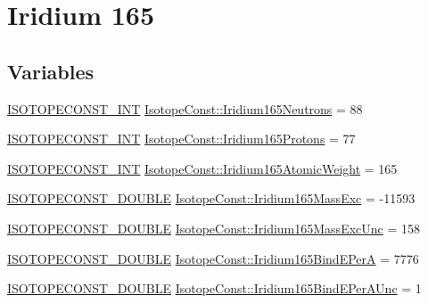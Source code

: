 \hypertarget{group___isotope_const-_iridium-_ir165}{}\section{Iridium 165}
\label{group___isotope_const-_iridium-_ir165}
\subsection*{Variables}
\begin{DoxyCompactItemize}
\item 
\mbox{\hyperlink{group___isotope_const-_macros_ga5f18360b3e99483a35c32d789e62621c}{I\+S\+O\+T\+O\+P\+E\+C\+O\+N\+S\+T\+\_\+\+I\+NT}} \mbox{\hyperlink{group___isotope_const-_iridium-_ir165_ga94b996e9bcab90deb0371a7df3cb9627}{Isotope\+Const\+::\+Iridium165\+Neutrons}} = 88
\item 
\mbox{\hyperlink{group___isotope_const-_macros_ga5f18360b3e99483a35c32d789e62621c}{I\+S\+O\+T\+O\+P\+E\+C\+O\+N\+S\+T\+\_\+\+I\+NT}} \mbox{\hyperlink{group___isotope_const-_iridium-_ir165_ga94d63f1c8b68cb888809b7d00ce1d406}{Isotope\+Const\+::\+Iridium165\+Protons}} = 77
\item 
\mbox{\hyperlink{group___isotope_const-_macros_ga5f18360b3e99483a35c32d789e62621c}{I\+S\+O\+T\+O\+P\+E\+C\+O\+N\+S\+T\+\_\+\+I\+NT}} \mbox{\hyperlink{group___isotope_const-_iridium-_ir165_gaa71f82a78adfeedee28b6da8de1dd3be}{Isotope\+Const\+::\+Iridium165\+Atomic\+Weight}} = 165
\item 
\mbox{\hyperlink{group___isotope_const-_macros_ga8f45a7272ce02c0b4c65c44636ed719a}{I\+S\+O\+T\+O\+P\+E\+C\+O\+N\+S\+T\+\_\+\+D\+O\+U\+B\+LE}} \mbox{\hyperlink{group___isotope_const-_iridium-_ir165_ga7c6456fe2a26f65103d356eb70e8ff64}{Isotope\+Const\+::\+Iridium165\+Mass\+Exc}} = -\/11593
\item 
\mbox{\hyperlink{group___isotope_const-_macros_ga8f45a7272ce02c0b4c65c44636ed719a}{I\+S\+O\+T\+O\+P\+E\+C\+O\+N\+S\+T\+\_\+\+D\+O\+U\+B\+LE}} \mbox{\hyperlink{group___isotope_const-_iridium-_ir165_ga08a353faafb18847ef16615e505c45d7}{Isotope\+Const\+::\+Iridium165\+Mass\+Exc\+Unc}} = 158
\item 
\mbox{\hyperlink{group___isotope_const-_macros_ga8f45a7272ce02c0b4c65c44636ed719a}{I\+S\+O\+T\+O\+P\+E\+C\+O\+N\+S\+T\+\_\+\+D\+O\+U\+B\+LE}} \mbox{\hyperlink{group___isotope_const-_iridium-_ir165_gada74e8ac97f49e6661e72a7fc52cc04c}{Isotope\+Const\+::\+Iridium165\+Bind\+E\+PerA}} = 7776
\item 
\mbox{\hyperlink{group___isotope_const-_macros_ga8f45a7272ce02c0b4c65c44636ed719a}{I\+S\+O\+T\+O\+P\+E\+C\+O\+N\+S\+T\+\_\+\+D\+O\+U\+B\+LE}} \mbox{\hyperlink{group___isotope_const-_iridium-_ir165_gacb484ec05d1f205ce83c207162ea207c}{Isotope\+Const\+::\+Iridium165\+Bind\+E\+Per\+A\+Unc}} = 1

\end{DoxyCompactItemize}
